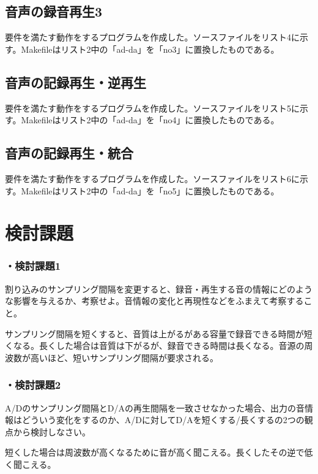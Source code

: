 \documentclass{jarticle}
\begin{document}
\subsection{音声の録音再生3}
要件を満たす動作をするプログラムを作成した。ソースファイルをリスト4に示す。Makefileはリスト2中の「ad-da」を「no3」に置換したものである。

\subsection{音声の記録再生・逆再生}
要件を満たす動作をするプログラムを作成した。ソースファイルをリスト5に示す。Makefileはリスト2中の「ad-da」を「no4」に置換したものである。

\subsection{音声の記録再生・統合}
要件を満たす動作をするプログラムを作成した。ソースファイルをリスト6に示す。Makefileはリスト2中の「ad-da」を「no5」に置換したものである。


\section{検討課題}
\subsubsection*{・検討課題1}
割り込みのサンプリング間隔を変更すると、録音・再生する音の情報にどのような影響を与えるか、考察せよ。音情報の変化と再現性などをふまえて考察すること。


サンプリング間隔を短くすると、音質は上がるがある容量で録音できる時間が短くなる。長くした場合は音質は下がるが、録音できる時間は長くなる。音源の周波数が高いほど、短いサンプリング間隔が要求される。

\subsubsection*{・検討課題2}
A/Dのサンプリング間隔とD/Aの再生間隔を一致させなかった場合、出力の音情報はどういう変化をするのか、A/Dに対してD/Aを短くする/長くするの2つの観点から検討しなさい。


短くした場合は周波数が高くなるために音が高く聞こえる。長くしたその逆で低く聞こえる。








\end{document}
